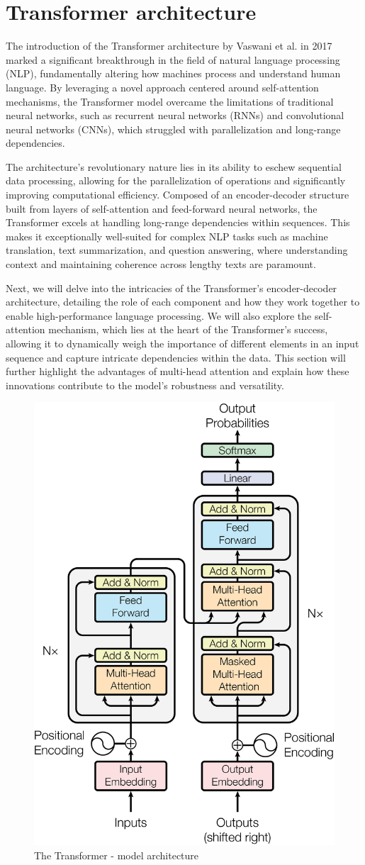 \section{Transformer architecture}

The introduction of the Transformer architecture by Vaswani et al. in 2017 marked a significant breakthrough in the field of natural language processing (NLP), fundamentally altering how machines process and understand human language. By leveraging a novel approach centered around self-attention mechanisms, the Transformer model overcame the limitations of traditional neural networks, such as recurrent neural networks (RNNs) and convolutional neural networks (CNNs), which struggled with parallelization and long-range dependencies.

The architecture's revolutionary nature lies in its ability to eschew sequential data processing, allowing for the parallelization of operations and significantly improving computational efficiency. Composed of an encoder-decoder structure built from layers of self-attention and feed-forward neural networks, the Transformer excels at handling long-range dependencies within sequences. This makes it exceptionally well-suited for complex NLP tasks such as machine translation, text summarization, and question answering, where understanding context and maintaining coherence across lengthy texts are paramount.

Next, we will delve into the intricacies of the Transformer's encoder-decoder architecture, detailing the role of each component and how they work together to enable high-performance language processing. We will also explore the self-attention mechanism, which lies at the heart of the Transformer's success, allowing it to dynamically weigh the importance of different elements in an input sequence and capture intricate dependencies within the data. This section will further highlight the advantages of multi-head attention and explain how these innovations contribute to the model's robustness and versatility.


\begin{figure}[htbp]
    \centering
    \includegraphics[width=6 cm]{3_ChapterTranformerVariants/figuras/Transformer_architecture.png}
    \caption{The Transformer - model architecture}
    \end{figure}

